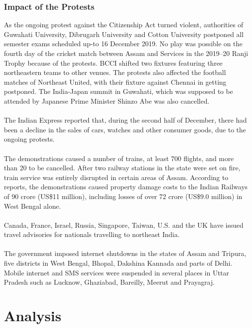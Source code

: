 \documentclass{article}
\begin{document}
\subsubsection{Impact of the Protests}
As the ongoing protest against the Citizenship Act turned violent, authorities of Guwahati University, Dibrugarh University and Cotton University postponed all semester exams scheduled up-to 16 December 2019. No play was possible on the fourth day of the cricket match between Assam and Services in the 2019–20 Ranji Trophy because of the protests. BCCI shifted two fixtures featuring three northeastern teams to other venues. The protests also affected the football matches of Northeast United, with their fixture against Chennai in getting postponed. The India-Japan summit in Guwahati, which was supposed to be attended by Japanese Prime Minister Shinzo Abe was also cancelled.\\ \\
The Indian Express reported that, during the second half of December, there had been a decline in the sales of cars, watches and other consumer goods, due to the ongoing protests.\\ \\
The demonstrations caused a number of trains, at least 700 flights, and more than 20 to be cancelled. After two railway stations in the state were set on fire, train service was entirely disrupted in certain areas of Assam. According to reports, the demonstrations caused property damage costs to the Indian Railways of 90 crore (US\$11 million), including losses of over 72 crore (US\$9.0 million) in West Bengal alone.\\ \\
Canada, France, Israel, Russia, Singapore, Taiwan, U.S. and the UK have issued travel advisories for nationals travelling to northeast India.\\ \\
The government imposed internet shutdowns in the states of Assam and Tripura, five districts in West Bengal, Bhopal, Dakshina Kannada and parts of Delhi. Mobile internet and SMS services were suspended in several places in Uttar Pradesh such as Lucknow,
Ghaziabad, Bareilly, Meerut and Prayagraj.

\section{Analysis}
\end{document}
